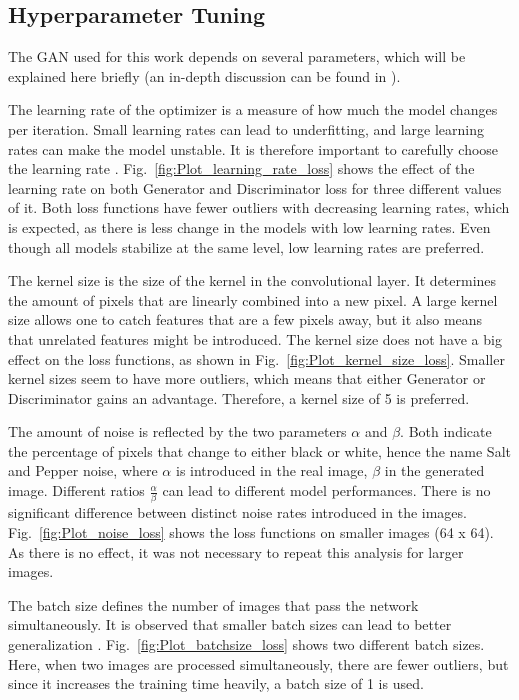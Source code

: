 \subsection{Hyperparameter Tuning}
The GAN used for this work depends on several parameters, which will be explained here briefly (an in-depth discussion can be found in \cite{murphy2022probabilistic}).

The learning rate of the optimizer is a measure of how much the model changes per iteration. Small learning rates can lead to underfitting, and large learning rates can make the model unstable. It is therefore important to carefully choose the learning rate \cite{murphy2022probabilistic}. Fig.~\ref{fig:Plot_learning_rate_loss} shows the effect of the learning rate on both Generator and Discriminator loss for three different values of it. Both loss functions have fewer outliers with decreasing learning rates, which is expected, as there is less change in the models with low learning rates. Even though all models stabilize at the same level, low learning rates are preferred.

The kernel size is the size of the kernel in the convolutional layer. It determines the amount of pixels that are linearly combined into a new pixel. A large kernel size allows one to catch features that are a few pixels away, but it also means that unrelated features might be introduced. The kernel size does not have a big effect on the loss functions, as shown in Fig.~\ref{fig:Plot_kernel_size_loss}. Smaller kernel sizes seem to have more outliers, which means that either Generator or Discriminator gains an advantage. Therefore, a kernel size of 5 is preferred.

The amount of noise is reflected by the two parameters $\alpha$ and $\beta$. Both indicate the percentage of pixels that change to either black or white, hence the name Salt and Pepper noise, where $\alpha$ is introduced in the real image, $\beta$ in the generated image. Different ratios $\frac{\alpha}{\beta}$ can lead to different model performances. There is no significant difference between distinct noise rates introduced in the images. Fig.~\ref{fig:Plot_noise_loss} shows the loss functions on smaller images (64 x 64). As there is no effect, it was not necessary to repeat this analysis for larger images. 

The batch size defines the number of images that pass the network simultaneously. It is observed that smaller batch sizes can lead to better generalization \cite{prince2023understanding}. Fig.~\ref{fig:Plot_batchsize_loss} shows two different batch sizes. Here, when two images are processed simultaneously, there are fewer outliers, but since it increases the training time heavily, a batch size of 1 is used.

